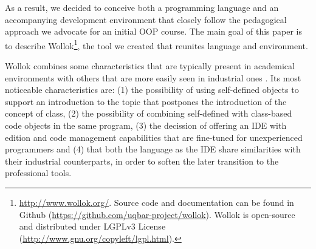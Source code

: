 As a result, we decided to conceive both a programming language and an accompanying development environment that  closely follow the pedagogical approach we advocate for an initial OOP course. 
The main goal of this paper is to describe Wollok\footnote{
	\url{http://www.wollok.org/}. 
	Source code and documentation can be found in Github 
	(\url{https://github.com/uqbar-project/wollok}).
	Wollok is open-source and distributed under LGPLv3 License 
	(\url{http://www.gnu.org/copyleft/lgpl.html}).}, 
the tool we created that reunites language and environment. 

\medskip
%

Wollok combines some characteristics that are typically present in academical environments with others that are more easily seen in industrial ones%
.
Its most noticeable characteristics are:
(1) the possibility of using self-defined objects to support an introduction to the topic that postpones the introduction of the concept of class,
(2) the possibility of combining self-defined with class-based code objects in the same program,
(3) the decission of offering an IDE with edition and code management capabilities that are fine-tuned for unexperienced programmers
and (4) that both the language as the IDE share similarities with their industrial counterparts, in order to soften the later transition to the professional tools.

\medskip 


